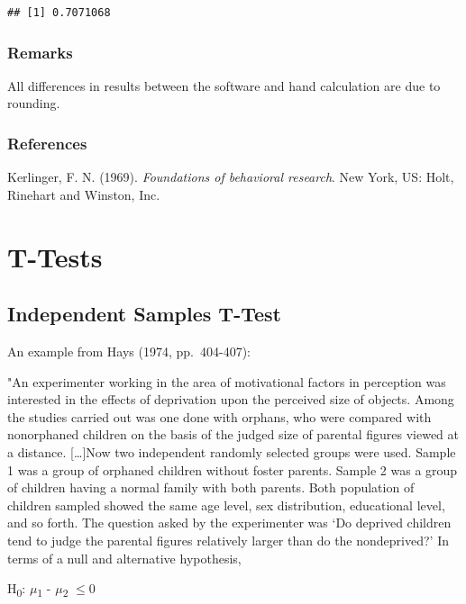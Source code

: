 \documentclass[
]{book}
\begin{document}
\begin{verbatim}
## [1] 0.7071068
\end{verbatim}

\hypertarget{remarks}{%
\subsection{Remarks}\label{remarks}}

All differences in results between the software and hand calculation are due to rounding.

\hypertarget{references}{%
\subsection{References}\label{references}}

Kerlinger, F. N. (1969). \emph{Foundations of behavioral research}. New York, US: Holt, Rinehart and Winston, Inc.

\hypertarget{t-tests}{%
\chapter{T-Tests}\label{t-tests}}

\hypertarget{independent-samples-t-test}{%
\section{Independent Samples T-Test}\label{independent-samples-t-test}}

An example from Hays (1974, pp.~404-407):

"An experimenter working in the area of motivational factors in perception was interested in the effects of deprivation upon the perceived size of objects. Among the studies carried out was one done with orphans, who were compared with nonorphaned children on the basis of the judged size of parental figures viewed at a distance. {[}\ldots{]}Now two independent randomly selected groups were used. Sample 1 was a group of orphaned children without foster parents. Sample 2 was a group of children having a normal family with both parents. Both population of children sampled showed the same age level, sex distribution, educational level, and so forth. The question asked by the experimenter was `Do deprived children tend to judge the parental figures relatively larger than do the nondeprived?' In terms of a null and alternative hypothesis,

H\textsubscript{0}: \(\mu\)\textsubscript{1} - \(\mu\)\textsubscript{2} \(\le 0\)
\end{document}

